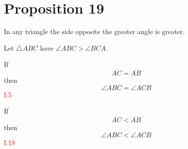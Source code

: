 
\section*{Proposition 19}

\begin{thm}
In any triangle the side opposite the greater angle is greater.
\end{thm}
 
Let $\triangle{ABC}$ have $\angle{ABC} > \angle{BCA}$.

\begin{figure}[H]
	\caption{}
\end{figure}

\begin{lemma}
If
\[ \overline{AC} = \overline{AB}\] 
then 
\[\angle{ABC} = \angle{ACB}\] \hfill\textcolor{red}{ I.5}
\end{lemma}

\begin{lemma}
If 
\[\overline{AC} < \overline{AB}\]
then 
\[\angle{ABC} < \angle{ACB}\]\hfill\textcolor{red}{ I.18}
\end{lemma}

